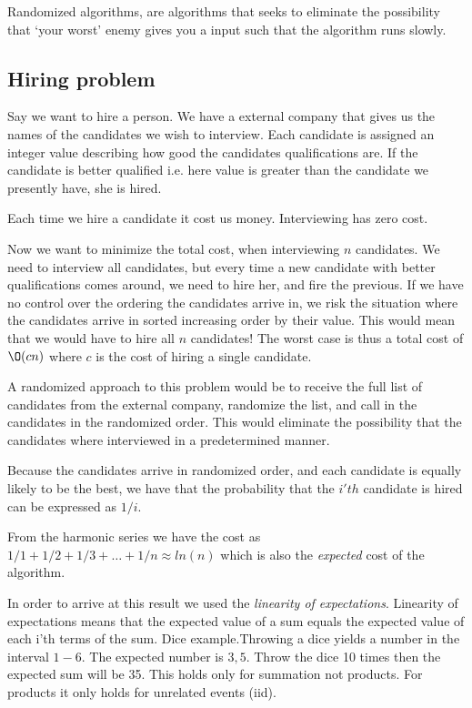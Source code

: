 \documentclass[10pt]{article}
\begin{document}
\newpage

\label{sec:randomized_algoritms}
Randomized algorithms, are algorithms that seeks to eliminate the possibility that `your worst' enemy gives you a input such that the algorithm runs slowly.

\subsection{Hiring problem} %
\label{sub:hiring_problem}
Say we want to hire a person. We have a external company that gives us the names of the candidates we wish to interview. Each candidate is assigned an integer value describing how good the candidates qualifications are. If the candidate is better qualified i.e. here value is greater than the candidate we presently have, she is hired.

Each time we hire a candidate it cost us money. Interviewing has zero cost.

Now we want to minimize the total cost, when interviewing $n$ candidates. We need to interview all candidates, but every time a new candidate with better qualifications comes around, we need to hire her, and fire the previous. If we have no control over the ordering the candidates arrive in, we risk the situation where the candidates arrive in sorted increasing order by their value. This would mean that we would have to hire all $n$ candidates! The worst case is thus a total cost of $\O(cn)$ where $c$ is the cost of hiring a single candidate.

A randomized approach to this problem would be to receive the full list of candidates from the external company, randomize the list, and call in the candidates in the randomized order. This would eliminate the possibility that the candidates where interviewed in a predetermined manner.

Because the candidates arrive in randomized order, and each candidate is equally likely to be the best, we have that the probability that the $i'th$ candidate is hired can be expressed as $1/i$.

From the harmonic series we have the cost as $1/1+1/2+1/3+\ldots+1/n \approx ln(n)$ which is also the \emph{expected} cost of the algorithm. 

In order to arrive at this result we used the \emph{linearity of expectations}. Linearity of expectations means that the expected value of a sum equals the expected value of each i'th terms of the sum. Dice example.Throwing a dice yields a number in the interval $1-6$. The expected number is $3,5$. Throw the dice 10 times then the expected sum will be 35. This holds only for summation not products. For products it only holds for unrelated events (iid).
\end{document}
